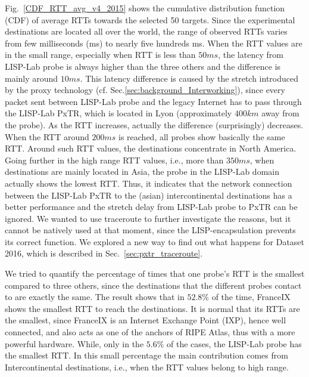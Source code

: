 Fig.~\ref{CDF_RTT_avg_v4_2015} shows the cumulative distribution function (CDF) of average RTTs towards the selected 50 targets. Since the experimental destinations are located all over the world, the range of observed RTTs varies from few milliseconds (ms) to nearly five hundreds ms. When the RTT values are in the small range, especially when RTT is less than $50ms$, the latency from LISP-Lab probe is always higher than the three others and the difference is mainly around $10ms$. This latency difference is caused by the stretch introduced by the proxy technology (cf. Sec.\ref{sec:background_Interworking}), since every packet sent between LISP-Lab probe and the legacy Internet has to pass through the LISP-Lab PxTR, which is located in Lyon (approximately $400km$ away from the probe). As the RTT increases, actually the difference (surprisingly) decreases. When the RTT around $200ms$ is reached, all probes show basically the same RTT. Around such RTT values, the destinations concentrate in North America. Going further in the high range RTT values, i.e., more than $350ms$, when destinations are mainly located in Asia, the probe in the LISP-Lab domain actually shows the lowest RTT. Thus, it indicates that the network connection between the LISP-Lab PxTR to the (asian) intercontinental destinations has a better performance and the stretch delay from LISP-Lab probe to PxTR can be ignored. We wanted to use traceroute to further investigate the reasons, but it cannot be natively used at that moment, since the LISP-encapsulation prevents its correct function. We explored a new way to find out what happens for Dataset 2016, which is described in Sec.~\ref{sec:pxtr_traceroute}. 
    
We tried to quantify the percentage of times that one probe's RTT is the smallest compared to three others, since the destinations that the different probes contact to are exactly the same. The result shows that in $52.8\%$ of the time, FranceIX shows the smallest RTT to reach the destinations. It is normal that its RTTs are the smallest, since FranceIX is an Internet Exchange Point (IXP), hence well connected, and also acts as one of the anchors of RIPE Atlas, thus with a more powerful hardware. While, only in the $5.6\%$ of the cases, the LISP-Lab probe has the smallest RTT. In this small percentage the main contribution comes from Intercontinental destinations, i.e., when the RTT values belong to high range.
    
